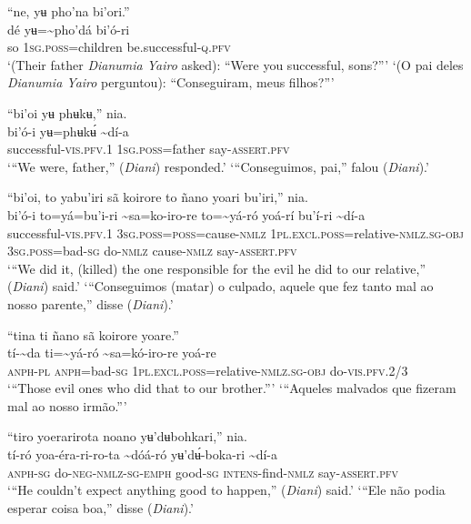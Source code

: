 \documentclass[output=paper,
modfonts,nonflat
]{langsci/langscibook}
\begin{document}
\ea “ne, yʉ pho'na bi’ori.”  \\[.3em]
\gll {\textasciitilde}dé	yʉ={\textasciitilde}pho'dá	bi'ó-ri \\
     so	1\textsc{sg.poss}=children	be.successful-\textsc{q.pfv}\\
\glt ‘(Their father \textit{Dianumia Yairo} asked): “Were you successful, sons?”’ 
\glt ‘(O pai deles \textit{Dianumia Yairo} perguntou): “Conseguiram, meus filhos?”’ 
\z 

\newpage 
\ea “bi’oi yʉ phʉkʉ,” nia. \\[.3em]
\gll bi’ó-i	yʉ=phʉkʉ́	{\textasciitilde}dí-a \\
     successful-\textsc{vis.pfv.}1	1\textsc{sg.poss}=father	say-\textsc{assert.pfv}\\
\glt ‘“We were, father,” (\textit{Diani}) responded.’
\glt ‘“Conseguimos, pai,” falou (\textit{Diani}).’
\z

\ea “bi’oi, to yabu'iri sã koirore to ñano yoari bu'iri,” nia. \\[.3em]
\gll bi’ó-i	to=yá=bu'i-ri	{\textasciitilde}sa=ko-iro-re to={\textasciitilde}yá-ró	yoá-rí	bu'í-ri	{\textasciitilde}dí-a\\
     successful-\textsc{vis.pfv.}1	3\textsc{sg.poss}=\textsc{poss}=cause\textsc{-nmlz}	1\textsc{pl.excl.poss}=relative\textsc{-nmlz.sg-obj} 3\textsc{sg.poss}=bad\textsc{-sg}	do\textsc{-nmlz}	cause\textsc{-nmlz}	say-\textsc{assert.pfv}\\
\glt ‘“We did it, (killed) the one responsible for the evil he did to our relative,” (\textit{Diani}) said.’
\glt ‘“Conseguimos (matar) o culpado, aquele que fez tanto mal ao nosso parente,” disse (\textit{Diani}).’
\z 

\ea “tina ti ñano sã koirore yoare.”  \\[.3em]
\gll tí-{\textasciitilde}da	ti={\textasciitilde}yá-ró	{\textasciitilde}sa=kó-iro-re	yoá-re \\
     \textsc{anph-pl}	\textsc{anph}=bad\textsc{-sg}	1\textsc{pl.excl.poss}=relative\textsc{-nmlz.sg-obj}	do-\textsc{vis.pfv.}2/3\\
\glt ‘“Those evil ones who did that to our brother.”’
\glt ‘“Aqueles malvados que fizeram mal ao nosso irmão.”’
\z 

\ea “tiro yoerarirota noano yʉ'dʉbohkari,” nia. \\[.3em]
\gll tí-ró	yoa-éra-ri-ro-ta	{\textasciitilde}dóá-ró	yʉ'dʉ́-boka-ri	{\textasciitilde}dí-a \\
     \textsc{anph-sg}	do\textsc{-neg-nmlz-sg-emph}	good\textsc{-sg}	\textsc{intens}-find\textsc{-nmlz}	say-\textsc{assert.pfv}\\
\glt ‘“He couldn't expect anything good to happen,” (\textit{Diani}) said.’
\glt ‘“Ele não podia esperar coisa boa,” disse (\textit{Diani}).’
\z 
\end{document}
